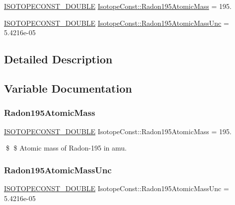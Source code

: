 \begin{DoxyCompactItemize}
\item 
\mbox{\hyperlink{group___isotope_const-_macros_ga8f45a7272ce02c0b4c65c44636ed719a}{I\+S\+O\+T\+O\+P\+E\+C\+O\+N\+S\+T\+\_\+\+D\+O\+U\+B\+LE}} \mbox{\hyperlink{group___isotope_const-_radon-_rn195_ga8b1b67ebff0bbf33312ef887b5b573e2}{Isotope\+Const\+::\+Radon195\+Atomic\+Mass}} = 195.
\item 
\mbox{\hyperlink{group___isotope_const-_macros_ga8f45a7272ce02c0b4c65c44636ed719a}{I\+S\+O\+T\+O\+P\+E\+C\+O\+N\+S\+T\+\_\+\+D\+O\+U\+B\+LE}} \mbox{\hyperlink{group___isotope_const-_radon-_rn195_ga8a4103224e452797788499fe8d1fe1a8}{Isotope\+Const\+::\+Radon195\+Atomic\+Mass\+Unc}} = 5.\+4216e-\/05
\end{DoxyCompactItemize}


\subsection{Detailed Description}


\subsection{Variable Documentation}
\mbox{\label{group___isotope_const-_radon-_rn195_ga8b1b67ebff0bbf33312ef887b5b573e2}} 
\subsubsection{\texorpdfstring{Radon195\+Atomic\+Mass}{Radon195AtomicMass}}
{\footnotesize\ttfamily \mbox{\hyperlink{group___isotope_const-_macros_ga8f45a7272ce02c0b4c65c44636ed719a}{I\+S\+O\+T\+O\+P\+E\+C\+O\+N\+S\+T\+\_\+\+D\+O\+U\+B\+LE}} Isotope\+Const\+::\+Radon195\+Atomic\+Mass = 195.}

\$ \$ Atomic mass of Radon-\/195 in amu. \mbox{\label{group___isotope_const-_radon-_rn195_ga8a4103224e452797788499fe8d1fe1a8}} 
\subsubsection{\texorpdfstring{Radon195\+Atomic\+Mass\+Unc}{Radon195AtomicMassUnc}}
{\footnotesize\ttfamily \mbox{\hyperlink{group___isotope_const-_macros_ga8f45a7272ce02c0b4c65c44636ed719a}{I\+S\+O\+T\+O\+P\+E\+C\+O\+N\+S\+T\+\_\+\+D\+O\+U\+B\+LE}} Isotope\+Const\+::\+Radon195\+Atomic\+Mass\+Unc = 5.\+4216e-\/05}

